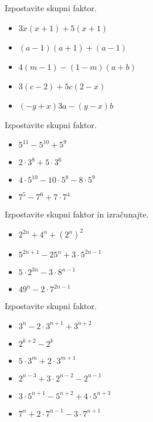 \begin{multicols}{2}
    
        
            \begin{naloga}
                Izpostavite skupni faktor.
                \begin{itemize}
                    \item $3x(x+1)+5(x+1)$ 
                    \item $(a-1)(a+1)+(a-1)$ 
                    \item $4(m-1)-(1-m)(a+b)$ 
                    \item $3(c-2)+5c(2-x)$ 
                    \item $(-y+x)3a-(y-x)b$ 
                \end{itemize}
            \end{naloga}
        
    
        
            \begin{naloga}
                Izpostavite skupni faktor.
                \begin{itemize}
                    \item $5^{11}-5^{10}+5^9$ 
                    \item $2\cdot 3^8+5\cdot 3^6$ 
                    \item $4\cdot 5^{10}-10\cdot 5^8-8\cdot 5^9$ 
                    \item $7^5-7^6+7\cdot 7^4$ 
                \end{itemize}
            \end{naloga}
        

            \begin{naloga}
                Izpostavite skupni faktor in izračunajte.
                \begin{itemize}
                    \item $2^{2n}+4^n+(2^n)^2$ 
                    \item $5^{2n+1}-25^n+3\cdot 5^{2n-1}$ 
                    \item $5\cdot 2^{3n}-3\cdot 8^{n-1}$ 
                    \item $49^n-2\cdot 7^{2n-1}$ 
                \end{itemize}
            \end{naloga}    
        

            \begin{naloga}
                Izpostavite skupni faktor.
                \begin{itemize}
                    \item $3^n-2\cdot 3^{n+1}+3^{n+2}$ 
                    \item $2^{k+2}-2^k$ 
                    \item $5\cdot 3^m+2\cdot 3^{m+1}$ 
                    \item $2^{n-3}+3\cdot 2^{n-2}-2^{n-1}$ 
                    \item $3\cdot 5^{n+1}-5^{n+2}+4\cdot 5^{n+3}$ 
                    \item $7^n+2\cdot 7^{n-1}-3\cdot 7^{n+1}$ 
                \end{itemize}
            \end{naloga}
        

\end{multicols}
